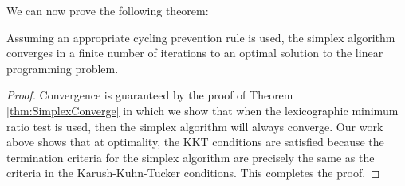 We can now prove the following theorem:
\begin{theorem} Assuming an appropriate cycling prevention rule is used, the simplex algorithm converges in a finite number of iterations to an optimal solution to the linear programming problem.
\end{theorem}
\begin{proof} Convergence is guaranteed by the proof of Theorem \ref{thm:SimplexConverge} in which we show that when the lexicographic minimum ratio test is used, then the simplex algorithm will always converge. Our work above shows that at optimality, the KKT conditions are satisfied because the termination criteria for the simplex algorithm are precisely the same as the criteria in the Karush-Kuhn-Tucker conditions. This completes the proof.
\end{proof}

